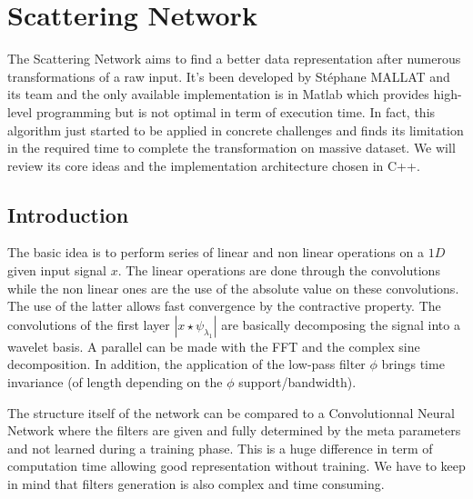 \documentclass[a4paper]{report}
\begin{document}
\chapter{Scattering Network}


The Scattering Network aims to find a better data representation after numerous transformations of a raw input. It's been developed by St\'ephane MALLAT and its team and the only available implementation is in Matlab which provides high-level programming but is not optimal in term of execution time. 
In fact, this algorithm just started to be applied in concrete challenges and finds its limitation in the required time to complete the transformation on massive dataset. We will review its core ideas and the implementation architecture chosen in C++.

\section{Introduction}\label{conv}


The basic idea is to perform series of linear and non linear operations on a $1D$ given input signal $x$. The linear operations are done through the convolutions while the non linear ones are the use of the absolute value on these convolutions. The use of the latter allows fast convergence by the contractive property. The convolutions of the first layer $|x \star \psi_{\lambda_1}|$ are basically decomposing the signal into a wavelet basis. A parallel can be made with the FFT and the complex sine decomposition. In addition, the application of the low-pass filter $\phi$ brings time invariance (of length depending on the $\phi$ support/bandwidth).


The structure itself of the network can be compared to a Convolutionnal Neural Network where the filters are given and fully determined by the meta parameters and not learned during a training phase. This is a huge difference in term of computation time allowing good representation without training. We have to keep in mind that filters generation is also complex and time consuming.
\end{document}
